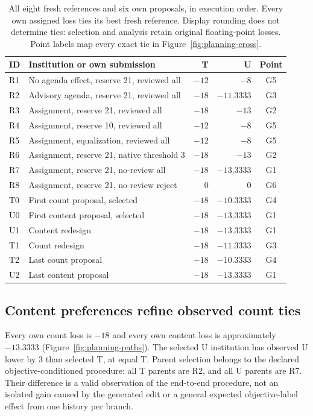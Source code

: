 \begin{table}[t]
\centering\small
\begin{tabular}{llrrc}
\toprule
ID & Institution or own submission & T & U & Point\\
\midrule
R1 & No agenda effect, reserve 21, reviewed all & $-12$ & $-8$ & G5\\
R2 & Advisory agenda, reserve 21, reviewed all & $-18$ & $-11.3333$ & G3\\
R3 & Assignment, reserve 21, reviewed all & $-18$ & $-13$ & G2\\
R4 & Assignment, reserve 10, reviewed all & $-12$ & $-8$ & G5\\
R5 & Assignment, equalization, reviewed all & $-12$ & $-8$ & G5\\
R6 & Assignment, reserve 21, native threshold 3 & $-18$ & $-13$ & G2\\
R7 & Assignment, reserve 21, no-review all & $-18$ & $-13.3333$ & G1\\
R8 & Assignment, reserve 21, no-review reject & $0$ & $0$ & G6\\
\midrule
T0 & First count proposal, selected & $-18$ & $-10.3333$ & G4\\
U0 & First content proposal, selected & $-18$ & $-13.3333$ & G1\\
U1 & Content redesign & $-18$ & $-13.3333$ & G1\\
T1 & Count redesign & $-18$ & $-11.3333$ & G3\\
T2 & Last count proposal & $-18$ & $-10.3333$ & G4\\
U2 & Last content proposal & $-18$ & $-13.3333$ & G1\\
\bottomrule
\end{tabular}
\caption{All eight fresh references and six own proposals, in execution order.
Every own assigned loss ties its best fresh reference. Display rounding does
not determine ties: selection and analysis retain original floating-point
losses. Point labels map every exact tie in Figure~\ref{fig:planning-cross}.}
\label{tab:planning-all}
\end{table}

\subsection{Content preferences refine observed count ties}
Every own count loss is $-18$ and every own content loss is approximately
$-13.3333$ (Figure~\ref{fig:planning-paths}). The selected U institution has
observed U lower by 3 than selected T, at equal T. Parent selection belongs to
the declared objective-conditioned procedure: all T parents are R2, and all U
parents are R7. Their difference is a valid observation of the end-to-end
procedure, not an isolated gain caused by the generated edit or a general
expected objective-label effect from one history per branch.

